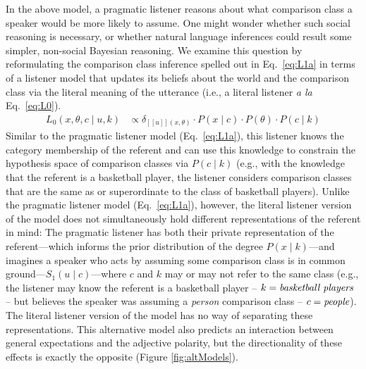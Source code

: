 \documentclass[doc, floatsintext]{apa6}
\newcommand{\ndg}[1]{\textcolor{Green}{[ndg: #1]}}
\begin{document}
In the above model, a pragmatic listener reasons about what comparison class a speaker would be more likely to assume.
One might wonder whether such social reasoning is necessary, or whether natural language inferences could result some simpler, non-social Bayesian reasoning. 
We examine this question by reformulating the comparison class inference spelled out in Eq.~\ref{eq:L1a} in terms of a listener model that updates its beliefs about the world and the comparison class via the literal meaning of the utterance (i.e., a literal listener \emph{a la} Eq.~\ref{eq:L0}). 
%
%
  \begin{align}
L_{0}(x, \theta, c \mid u, k) &\propto \delta_{[\![u]\!](x, \theta)} \cdot P(x \mid c)\cdot P(\theta) \cdot P(c \mid k)  \label{eq:L0alt}
\end{align}
%
Similar to the pragmatic listener model (Eq.~\ref{eq:L1a}), this listener knows the category membership of the referent and can use this knowledge to constrain the hypothesis space of comparison classes via $P(c \mid k)$ (e.g., with the knowledge that the referent is a basketball player, the listener considers comparison classes that are the same as or superordinate to the class of basketball players).
Unlike the pragmatic listener model (Eq.~\ref{eq:L1a}), however, the literal listener version of the model does not simultaneously hold different representations of the referent in mind: The pragmatic listener has both their private representation of the referent---which informs the prior distribution of the degree $P(x \mid k)$---and imagines a speaker who acts by assuming some comparison class is in common ground---$S_1(u \mid c)$---where $c$ and $k$ may or may not refer to the same class (e.g., the listener may know the referent is a basketball player -- $k = \emph{basketball players}$ -- but believes the speaker was assuming a \emph{person} comparison class -- $c = \emph{people}$).
The literal listener version of the model has no way of separating these representations.
This alternative model also predicts an interaction between general expectations and the adjective polarity, but the directionality of these effects is exactly the opposite (Figure \ref{fig:altModels}).
\end{document}
